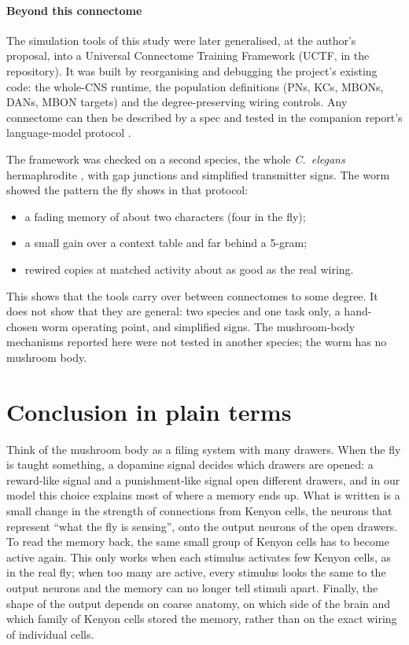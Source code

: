 \documentclass[conference]{IEEEtran}
\begin{document}
\paragraph*{Beyond this connectome}
The simulation tools of this study were later generalised, at the author's
proposal, into a Universal Connectome Training Framework (UCTF, in the
repository). It was built by reorganising and debugging the project's existing
code: the whole-CNS runtime, the population definitions (PNs, KCs, MBONs,
DANs, MBON targets) and the degree-preserving wiring controls. Any connectome
can then be described by a spec and tested in the companion report's
language-model protocol \cite{lmcompanion}.

The framework was checked on a second species, the whole \textit{C.~elegans}
hermaphrodite \cite{cook2019}, with gap junctions and simplified transmitter
signs. The worm showed the pattern the fly shows in that protocol:
\begin{itemize}
\item a fading memory of about two characters (four in the fly);
\item a small gain over a context table and far behind a 5-gram;
\item rewired copies at matched activity about as good as the real wiring.
\end{itemize}

This shows that the tools carry over between connectomes to some degree. It
does not show that they are general: two species and one task only, a
hand-chosen worm operating point, and simplified signs. The mushroom-body
mechanisms reported here were not tested in another species; the worm has no
mushroom body.

\section{Conclusion in plain terms}
Think of the mushroom body as a filing system with many drawers. When the fly
is taught something, a dopamine signal decides which drawers are opened: a
reward-like signal and a punishment-like signal open different drawers, and in
our model this choice explains most of where a memory ends up. What is written
is a small change in the strength of connections from Kenyon cells, the
neurons that represent ``what the fly is sensing'', onto the output neurons of
the open drawers. To read the memory back, the same small group of Kenyon cells
has to become active again. This only works when each stimulus activates few
Kenyon cells, as in the real fly; when too many are active, every stimulus
looks the same to the output neurons and the memory can no longer tell stimuli
apart. Finally, the shape of the output depends on coarse anatomy, on which
side of the brain and which family of Kenyon cells stored the memory, rather
than on the exact wiring of individual cells.
\end{document}
